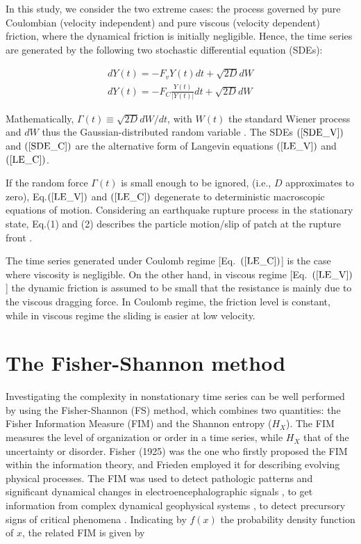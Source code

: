 \documentclass[%
 aip,
rsi,%
 amsmath,amssymb,
 reprint,%
]{revtex4-1}
\begin{document}
In this study, we consider the two extreme cases: the process governed by pure Coulombian (velocity independent) and pure viscous (velocity dependent) friction, where the dynamical friction is initially negligible. Hence, the time series are generated by the following two stochastic differential equation (SDEs):

\begin{eqnarray}
    dY(t)=-F_vY(t)dt+\sqrt{2D}dW \label{SDE_V}
    \\
    dY(t)=-F_C \frac{Y(t)}{|Y(t)|} dt+\sqrt{2D}dW \label{SDE_C}
\end{eqnarray}

Mathematically, $\Gamma(t)\equiv \sqrt{2D} dW/dt$, with $W(t)$ the standard Wiener process and $dW$ thus the Gaussian-distributed random variable \cite{risken_fokker-planck_1989,jacobs_stochastic_2010}. The SDEs $(\ref{SDE_V})$ and $(\ref{SDE_C})$ are the alternative form of Langevin equations $(\ref{LE_V})$ and $(\ref{LE_C})$.

If the random force $\Gamma(t)$ is small enough to be ignored, (i.e., $D$ approximates to zero), Eq.$(\ref{LE_V})$ and $(\ref{LE_C})$ degenerate to deterministic macroscopic equations of motion. Considering an earthquake rupture process in the stationary state, Eq.(1) and (2) describes the particle motion/slip of patch at the rupture front \cite{wu_stochastic_2018}.


The time series generated under Coulomb regime [Eq.~$(\ref{LE_C})$] is the case where viscosity is negligible. On the other hand, in viscous regime [Eq.~$(\ref{LE_V})$] the dynamic friction is assumed to be small that the resistance is mainly due to the viscous dragging force. In Coulomb regime, the friction level is constant, while in viscous regime the sliding is easier at low velocity.

\section{The Fisher-Shannon method}
Investigating the complexity in nonstationary time series can be well performed by using the Fisher-Shannon (FS) method, which combines two quantities: the Fisher Information Measure (FIM) and the Shannon entropy ($H_X$). The FIM measures the level of organization or order in a time series, while $H_X$ that of the uncertainty or disorder. Fisher (1925)\cite{fisher_theory_1925} was the one who firstly proposed the FIM within the information theory, and Frieden \cite{frieden_fisher_1990} employed it for describing evolving physical processes. The FIM was used to detect pathologic patterns and significant dynamical changes in electroencephalographic signals \cite{martin_fishers_1999,martin_fisher_2001}, to get information from complex dynamical geophysical systems  \cite{lovallo_complexity_2011,telesca_analysis_2011,telesca_analysis_2011-1}, to detect precursory signs of critical phenomena \cite{telesca_time-dependent_2010,telesca_nonlinear_2009}.
Indicating by $f(x)$ the probability density function of $x$, the related FIM is given by
\end{document}
